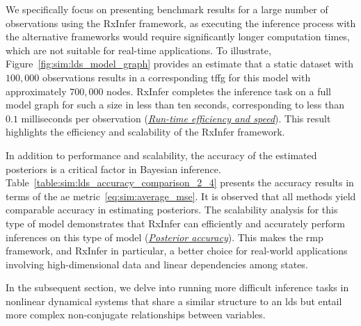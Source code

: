 We specifically focus on presenting benchmark results for a large number of observations using
the RxInfer framework, as executing the inference process with the alternative frameworks would
require significantly longer computation times, which are not suitable for real-time
applications.
To illustrate, Figure~\ref{fig:sim:lds_model_graph} provides an estimate that a static
dataset with $100,000$ observations results in a corresponding \ac{tffg}
for this model with approximately $700,000$ nodes.
RxInfer completes the inference task on a full model graph for such a size in less than ten
seconds, corresponding to less than $0.1$ milliseconds per observation (\hyperlink{experiments:efficiency}{\emph{Run-time efficiency and speed}}).
This result highlights the efficiency and scalability of the RxInfer framework.

In addition to performance and scalability, the accuracy of the estimated posteriors is a
critical factor in Bayesian inference.
Table~\ref{table:sim:lds_accuracy_comparison_2_4} presents the accuracy results in terms of
the \ac{ae} metric~\eqref{eq:sim:average_mse}.
It is observed that all methods yield comparable accuracy in estimating posteriors.
The scalability analysis for this type of model demonstrates that RxInfer can efficiently and
accurately perform inferences on this type of model (\hyperlink{experiments:accuracy}{\emph{Posterior accuracy}}).
This makes the \ac{rmp} framework, and RxInfer in particular, a better choice for real-world
applications involving high-dimensional data and linear dependencies among states.

In the subsequent section, we delve into running more difficult inference tasks in nonlinear
dynamical systems that share a similar structure to an \ac{lds} but entail more complex non-conjugate
relationships between variables.

